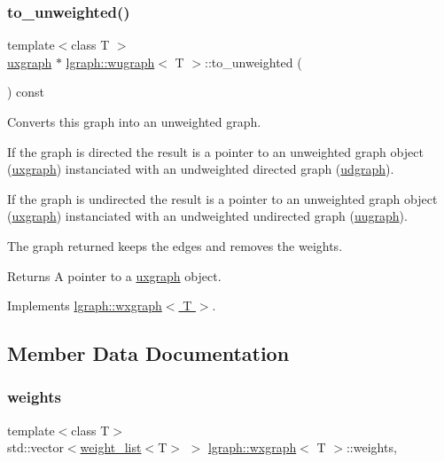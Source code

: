 \subsubsection{\texorpdfstring{to\+\_\+unweighted()}{to\_unweighted()}}
{\footnotesize\ttfamily template$<$class T $>$ \\
\hyperlink{classlgraph_1_1uxgraph}{uxgraph} $\ast$ \hyperlink{classlgraph_1_1wugraph}{lgraph\+::wugraph}$<$ T $>$\+::to\+\_\+unweighted (\begin{DoxyParamCaption}{ }\end{DoxyParamCaption}) const\hspace{0.3cm}{\ttfamily [virtual]}}



Converts this graph into an unweighted graph. 

If the graph is directed the result is a pointer to an unweighted graph object (\hyperlink{classlgraph_1_1uxgraph}{uxgraph}) instanciated with an undweighted directed graph (\hyperlink{classlgraph_1_1udgraph}{udgraph}).

If the graph is undirected the result is a pointer to an unweighted graph object (\hyperlink{classlgraph_1_1uxgraph}{uxgraph}) instanciated with an undweighted undirected graph (\hyperlink{classlgraph_1_1uugraph}{uugraph}).

The graph returned keeps the edges and removes the weights.

\begin{DoxyReturn}{Returns}
A pointer to a \hyperlink{classlgraph_1_1uxgraph}{uxgraph} object. 
\end{DoxyReturn}


Implements \hyperlink{classlgraph_1_1wxgraph_a7fcd56f02a50591ba3ce5e5c7792b4aa}{lgraph\+::wxgraph$<$ T $>$}.



\subsection{Member Data Documentation}
\mbox{\label{classlgraph_1_1wxgraph_a6f8c983edc82913c2d78b7bc871defe8}} 
\subsubsection{\texorpdfstring{weights}{weights}}
{\footnotesize\ttfamily template$<$class T$>$ \\
std\+::vector$<$\hyperlink{namespacelgraph_a1e0fd5ef0a78b2a92da48adbed265cb6}{weight\+\_\+list}$<$T$>$ $>$ \hyperlink{classlgraph_1_1wxgraph}{lgraph\+::wxgraph}$<$ T $>$\+::weights\hspace{0.3cm}{\ttfamily [protected]}, {\ttfamily [inherited]}}



